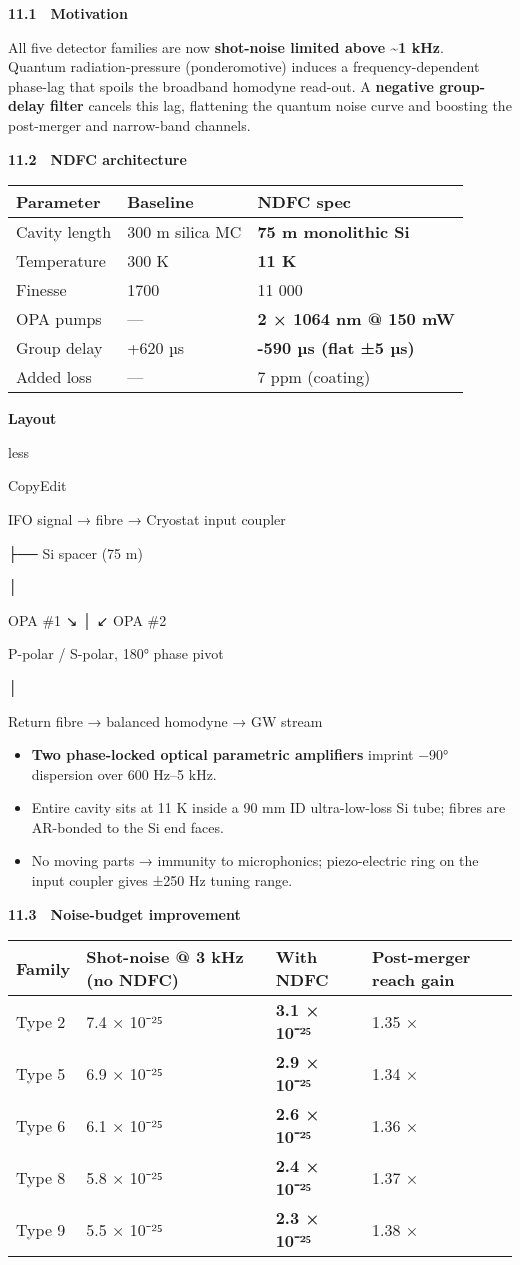 \documentclass[]{article}
\begin{document}
\textbf{11.1 Motivation}

All five detector families are now \textbf{shot-noise limited above
\textasciitilde{}1 kHz}.\\
Quantum radiation-pressure (ponderomotive) induces a frequency-dependent
phase-lag that spoils the broadband homodyne read-out. A
\textbf{negative group-delay filter} cancels this lag, flattening the
quantum noise curve and boosting the post-merger and narrow-band
channels.

\textbf{11.2 NDFC architecture}

\begin{longtable}[]{@{}lll@{}}
\toprule
\textbf{Parameter} & \textbf{Baseline} & \textbf{NDFC
spec}\tabularnewline
\midrule
\endhead
Cavity length & 300 m silica MC & \textbf{75 m monolithic
Si}\tabularnewline
Temperature & 300 K & \textbf{11 K}\tabularnewline
Finesse & 1700 & 11 000\tabularnewline
OPA pumps & --- & \textbf{2 × 1064 nm @ 150 mW}\tabularnewline
Group delay & +620 µs & \textbf{-590 µs (flat ±5 µs)}\tabularnewline
Added loss & --- & 7 ppm (coating)\tabularnewline
\bottomrule
\end{longtable}

\textbf{Layout}

less

CopyEdit

IFO signal → fibre → Cryostat input coupler

├── Si spacer (75 m)

│

OPA \#1 ↘ │ ↙ OPA \#2

P-polar / S-polar, 180° phase pivot

│

Return fibre → balanced homodyne → GW stream

\begin{itemize}
\item
  \textbf{Two phase-locked optical parametric amplifiers} imprint −90°
  dispersion over 600 Hz--5 kHz.
\item
  Entire cavity sits at 11 K inside a 90 mm ID ultra-low-loss Si tube;
  fibres are AR-bonded to the Si end faces.
\item
  No moving parts → immunity to microphonics; piezo-electric ring on the
  input coupler gives ±250 Hz tuning range.
\end{itemize}

\textbf{11.3 Noise-budget improvement}

\begin{longtable}[]{@{}llll@{}}
\toprule
\textbf{Family} & \textbf{Shot-noise @ 3 kHz (no NDFC)} & \textbf{With
NDFC} & \textbf{Post-merger reach gain}\tabularnewline
\midrule
\endhead
Type 2 & 7.4 × 10⁻²⁵ & \textbf{3.1 × 10⁻²⁵} & 1.35 ×\tabularnewline
Type 5 & 6.9 × 10⁻²⁵ & \textbf{2.9 × 10⁻²⁵} & 1.34 ×\tabularnewline
Type 6 & 6.1 × 10⁻²⁵ & \textbf{2.6 × 10⁻²⁵} & 1.36 ×\tabularnewline
Type 8 & 5.8 × 10⁻²⁵ & \textbf{2.4 × 10⁻²⁵} & 1.37 ×\tabularnewline
Type 9 & 5.5 × 10⁻²⁵ & \textbf{2.3 × 10⁻²⁵} & 1.38 ×\tabularnewline
\bottomrule
\end{longtable}
\end{document}
